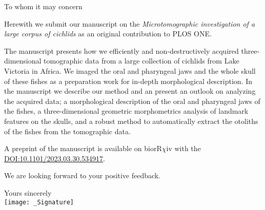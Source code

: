 \documentclass[color,english,personal]{ubletter}
\begin{document}
 
\begin{letter}{}
\subject{Submission of manuscript for publication}
\opening{To whom it may concern}

Herewith we submit our manuscript on the \emph{Microtomographic investigation of a large
corpus of cichlids} as an original contribution to PLOS ONE.

The manuscript presents how we efficiently and non-destructively acquired three-dimensional tomographic data from a large collection of cichlids from Lake Victoria in Africa.
We imaged the oral and pharyngeal jaws and the whole skull of these fishes as a preparation work for in-depth morphological description.
In the manuscript we describe our method and an present an outlook on analyzing the acquired data; a morphological description of the oral and pharyngeal jaws of the fishes, a three-dimensional geometric morphometrics analysis of landmark features on the skulls, and a robust method to automatically extract the otoliths of the fishes from the tomographic data.

A preprint of the manuscript is available on biorR\(\chi\)iv with the \href{https://doi.org/10.1101/2023.03.30.534917}{DOI:10.1101/2023.03.30.534917}.

We are looking forward to your positive feedback.

\addtolength{\medskipamount}{-\medskipamount} %
\closing{Yours sincerely\\\texttt{[image: \_Signature]}}
\end{letter}
\end{document}
